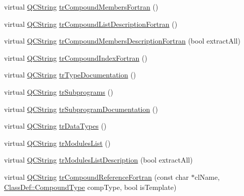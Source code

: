 \begin{DoxyCompactItemize}
\item 
virtual \mbox{\hyperlink{class_q_c_string}{Q\+C\+String}} \mbox{\hyperlink{class_translator_chinese_a954fa67b390e237996d34fe6819cd9d5}{tr\+Compound\+Members\+Fortran}} ()
\item 
virtual \mbox{\hyperlink{class_q_c_string}{Q\+C\+String}} \mbox{\hyperlink{class_translator_chinese_aadbc404b206a2fa05a8bdeffbade0d83}{tr\+Compound\+List\+Description\+Fortran}} ()
\item 
virtual \mbox{\hyperlink{class_q_c_string}{Q\+C\+String}} \mbox{\hyperlink{class_translator_chinese_ae8cdfdaeb6152a65560045241010cf51}{tr\+Compound\+Members\+Description\+Fortran}} (bool extract\+All)
\item 
virtual \mbox{\hyperlink{class_q_c_string}{Q\+C\+String}} \mbox{\hyperlink{class_translator_chinese_a4b4771837d68a9d9aa2f4950d0e05c82}{tr\+Compound\+Index\+Fortran}} ()
\item 
virtual \mbox{\hyperlink{class_q_c_string}{Q\+C\+String}} \mbox{\hyperlink{class_translator_chinese_ad7774d0b6f934b0bc8ee4b9f3d2e2bfc}{tr\+Type\+Documentation}} ()
\item 
virtual \mbox{\hyperlink{class_q_c_string}{Q\+C\+String}} \mbox{\hyperlink{class_translator_chinese_a928e1e68399241494a874d409dadf304}{tr\+Subprograms}} ()
\item 
virtual \mbox{\hyperlink{class_q_c_string}{Q\+C\+String}} \mbox{\hyperlink{class_translator_chinese_a629a2e317851be06837a5e7d0b285bf0}{tr\+Subprogram\+Documentation}} ()
\item 
virtual \mbox{\hyperlink{class_q_c_string}{Q\+C\+String}} \mbox{\hyperlink{class_translator_chinese_a6d8814bd6b69896ad0209dd6ba075cf7}{tr\+Data\+Types}} ()
\item 
virtual \mbox{\hyperlink{class_q_c_string}{Q\+C\+String}} \mbox{\hyperlink{class_translator_chinese_a392a4635cdeb71c8906f57e80e7cc131}{tr\+Modules\+List}} ()
\item 
virtual \mbox{\hyperlink{class_q_c_string}{Q\+C\+String}} \mbox{\hyperlink{class_translator_chinese_afd29bf2ca31ad924bb9c8d0baa73a0c3}{tr\+Modules\+List\+Description}} (bool extract\+All)
\item 
virtual \mbox{\hyperlink{class_q_c_string}{Q\+C\+String}} \mbox{\hyperlink{class_translator_chinese_a31f0f3d3861a8c43aadb9e55ee24048a}{tr\+Compound\+Reference\+Fortran}} (const char $\ast$cl\+Name, \mbox{\hyperlink{class_class_def_ae70cf86d35fe954a94c566fbcfc87939}{Class\+Def\+::\+Compound\+Type}} comp\+Type, bool is\+Template)
\item 

\end{DoxyCompactItemize}
